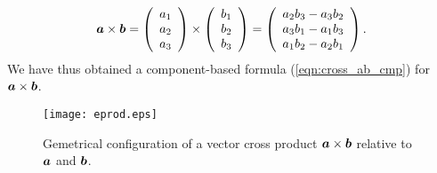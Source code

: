 \documentclass[10pt,a4j]{article}
\begin{document}
\begin{equation}
    \mbox{\boldmath $a$}\times \mbox{\boldmath $b$}
    =
    \left(
        \begin{array}{c}
            a_1 \\
            a_2 \\ 
            a_3 
        \end{array}
    \right)
    \times
    \left(
        \begin{array}{c}
            b_1 \\
            b_2 \\ 
            b_3 
        \end{array}
    \right)
    =
    \left(
        \begin{array}{c}
            a_2b_3-a_3b_2 \\

            a_3b_1-a_1b_3 \\ 
            a_1b_2-a_2b_1
        \end{array}
    \right)
    \label{eqn:cross_ab_cmp}.
\end{equation}
We have thus obtained a component-based formula (\ref{eqn:cross_ab_cmp}) for $\mbox{\boldmath $a$}\times\mbox{\boldmath $b$}$.
\begin{figure}[h]
    \begin{center}
    \texttt{[image: eprod.eps]} 
    \end{center}
    \caption{Gemetrical configuration of a vector cross product 
    $\mbox{\boldmath $a$}\times\mbox{\boldmath $b$}$ relative to $\mbox{\boldmath $a$}$ and $\mbox{\boldmath $b$}$.} 
    \label{fig:fig1_6}
\end{figure}
\end{document}
